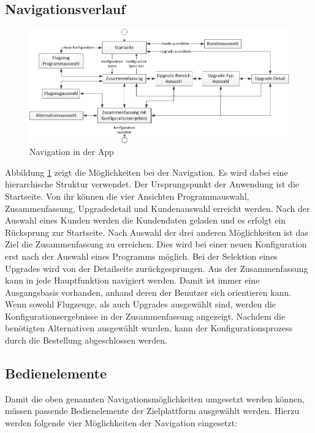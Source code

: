 \subsection{Navigationsverlauf}
\begin{figure}
\centering
\includegraphics[width=\hsize]{images/workflow_navigation}
\caption{Navigation in der App}
\label{appNavigation}
\end{figure}
Abbildung \ref{appNavigation} zeigt die Möglichkeiten bei der Navigation. Es wird dabei eine hierarchische Struktur verwendet. Der Ursprungspunkt der Anwendung ist die Startseite. Von ihr können die vier Ansichten Programmauswahl, Zusammenfassung, Upgradedetail und Kundenauswahl erreicht werden.  Nach der Auswahl eines Kunden werden die Kundendaten geladen und es erfolgt ein Rücksprung zur Startseite. Nach Auswahl der drei anderen Möglichkeiten ist das Ziel die Zusammenfassung zu erreichen. Dies wird bei einer neuen Konfiguration erst nach der Auswahl eines Programms möglich. Bei der Selektion eines Upgrades wird von der Detailseite zurückgesprungen. Aus der Zusammenfassung kann in jede Hauptfunktion navigiert werden. Damit ist immer eine Ausgangsbasis vorhanden, anhand deren der Benutzer sich orientieren kann. Wenn sowohl Flugzeuge, als auch Upgrades ausgewählt sind, werden die Konfigurationsergebnisse in der Zusammenfassung angezeigt. Nachdem die benötigten Alternativen ausgewählt wurden, kann der Konfigurationsprozess durch die Bestellung abgeschlossen werden.
 
\subsection{Bedienelemente}
Damit die oben genannten Navigationsmöglichkeiten umgesetzt werden können, müssen passende Bedienelemente der Zielplattform ausgewählt werden. Hierzu werden folgende vier Möglichkeiten der Navigation eingesetzt: \par

